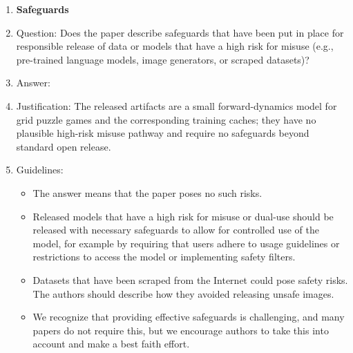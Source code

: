 \begin{enumerate}
\begin{itemize}
        \item The authors should consider possible harms that could arise when the technology is being used as intended and functioning correctly, harms that could arise when the technology is being used as intended but gives incorrect results, and harms following from (intentional or unintentional) misuse of the technology.
        \item If there are negative societal impacts, the authors could also discuss possible mitigation strategies (e.g., gated release of models, providing defenses in addition to attacks, mechanisms for monitoring misuse, mechanisms to monitor how a system learns from feedback over time, improving the efficiency and accessibility of ML).
    \end{itemize}

\item {\bf Safeguards}
    \item[] Question: Does the paper describe safeguards that have been put in place for responsible release of data or models that have a high risk for misuse (e.g., pre-trained language models, image generators, or scraped datasets)?
    \item[] Answer: \answerNA{}
    \item[] Justification: The released artifacts are a small forward-dynamics model for grid puzzle games and the corresponding training caches; they have no plausible high-risk misuse pathway and require no safeguards beyond standard open release.
    \item[] Guidelines:
    \begin{itemize}
        \item The answer \answerNA{} means that the paper poses no such risks.
        \item Released models that have a high risk for misuse or dual-use should be released with necessary safeguards to allow for controlled use of the model, for example by requiring that users adhere to usage guidelines or restrictions to access the model or implementing safety filters.
        \item Datasets that have been scraped from the Internet could pose safety risks. The authors should describe how they avoided releasing unsafe images.
        \item We recognize that providing effective safeguards is challenging, and many papers do not require this, but we encourage authors to take this into account and make a best faith effort.
    \end{itemize}


\end{enumerate}
